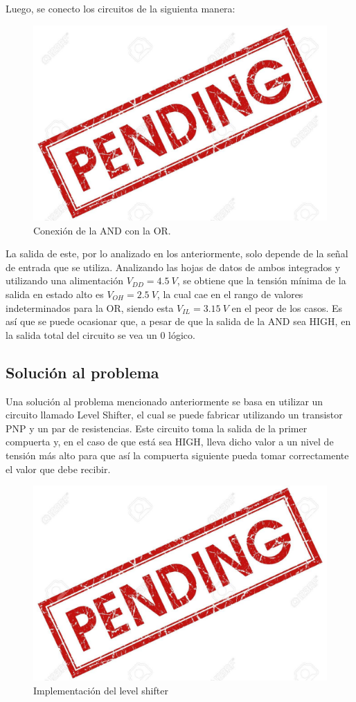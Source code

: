 Luego, se conecto los circuitos de la siguienta manera:
\begin{figure}[h]
    \centering
    \includegraphics{ImagenesEjercicio5/pend.jpg}
    \caption{Conexión de la AND con la OR.}
\end{figure}

La salida de este, por lo analizado en los anteriormente, solo depende de la señal de entrada que se utiliza. Analizando las hojas de datos de ambos integrados y utilizando una alimentación $V_{DD}= 4.5 \ V$, se obtiene que la tensión mínima de la salida en estado alto es $V_{OH}=2.5 \ V$, la cual cae en el rango de valores indeterminados para la OR, siendo esta $V_{IL}= 3.15 \ V$ en el peor de los casos. Es así que se puede ocasionar que, a pesar de que la salida de la AND sea HIGH, en la salida total del circuito se vea un 0 lógico.

\subsection{Solución al problema}

Una solución al problema mencionado anteriormente se basa en utilizar un circuito llamado Level Shifter, el cual se puede fabricar utilizando un transistor PNP y un par de resistencias. Este circuito toma la salida de la primer compuerta y, en el caso de que está sea HIGH, lleva dicho valor a un nivel de tensión más alto para que así la compuerta siguiente pueda tomar correctamente el valor que debe recibir.

\begin{figure}[h]
    \centering
    \includegraphics{ImagenesEjercicio5/pend.jpg}
    \caption{Implementación del level shifter}
\end{figure}

